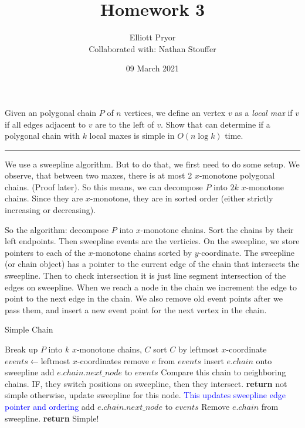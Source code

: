 \documentclass[11pt]{article}
\title{Homework 3}
\author{Elliott Pryor \\
Collaborated with: Nathan Stouffer}
\date{09 March 2021}
\begin{document}
\maketitle


Given an polygonal chain $P$ of $n$ vertices, we define an vertex $v$ as a
\emph{local max} if $v$ if all edges adjacent to $v$ are to the left of $v$.
Show that can determine if a polygonal chain with $k$ local maxes is simple in
$O(n \log k)$ time.

\hrule

We use a sweepline algorithm. But to do that, we first need to do some setup. 
We observe, that between two maxes, there is at most 2 $x$-monotone polygonal chains.
(Proof later). So this means, we can decompose $P$ into $2k$ $x$-monotone chains.
Since they are $x$-monotone, they are in sorted order (either strictly increasing or decreasing).

So the algorithm: decompose $P$ into $x$-monotone chains.
Sort the chains by their left endpoints. 
Then sweepline events are the verticies. On the sweepline, we store pointers
to each of the $x$-monotone chains sorted by $y$-coordinate.
The sweepline (or chain object) has a pointer to the current edge of the chain that intersects the sweepline.
Then to check intersection it is just line segment intersection of the edges on sweepline.
When we reach a node in the chain we increment the edge to point to the next edge in the chain.
We also remove old event points after we pass them, and insert a new event point for the next
vertex in the chain. 


\begin{algorithm}
    \caption{Simple Chain}
    \label{alg:neighbors}
    \begin{algorithmic}[1]
        \State Break up $P$ into $k$ $x$-monotone chains, $C$
        \State sort $C$ by leftmost $x$-coordinate
        \State $events \gets $leftmost $x$-coordinates
            \State remove $e$ from $events$
                \State insert $e.chain$ onto sweepline
                \State add $e.chain.next\_node$ to $events$
                \State Compare this chain to neighboring chains.
                \State IF, they switch positions on sweepline, then they intersect. \textbf{return} not simple
                \State otherwise, update sweepline for this node. \textcolor{blue}{This updates sweepline edge pointer and ordering}
                \State add $e.chain.next\_node$ to $events$ 
            \Else
                \State Remove $e.chain$ from sweepline.
            \EndIf
        \EndFor
        \State \textbf{return} Simple!
    \EndFunction
    \end{algorithmic}
\end{algorithm}
\end{document}
